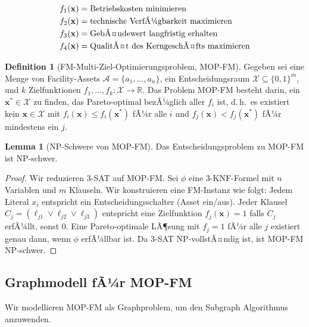 ﻿\documentclass[a4paper,12pt]{article}
\theoremstyle{definition}
\newtheorem{definition}{Definition}[section]
\newtheorem{lemma}{Lemma}[section]
\begin{document}
\begin{align}
    f_1(\mathbf{x}) &= \text{Betriebskosten minimieren} \notag \\
    f_2(\mathbf{x}) &= \text{technische VerfÃ¼gbarkeit maximieren} \notag \\
    f_3(\mathbf{x}) &= \text{GebÃ¤udewert langfristig erhalten} \notag \\
    f_4(\mathbf{x}) &= \text{QualitÃ¤t des KerngeschÃ¤fts maximieren} \notag
\end{align}

\begin{definition}[FM-Multi-Ziel-Optimierungsproblem, MOP-FM]
\label{def:mopfm}
Gegeben sei eine Menge von Facility-Assets $\mathcal{A} = \{a_1, \ldots, a_n\}$,
ein Entscheidungsraum $\mathcal{X} \subseteq \{0,1\}^m$, und $k$ Zielfunktionen
$f_1, \ldots, f_k : \mathcal{X} \to \mathbb{R}$.
Das Problem MOP-FM besteht darin, ein $\mathbf{x}^* \in \mathcal{X}$ zu finden,
das Pareto-optimal bezÃ¼glich aller $f_i$ ist, d.\,h.\ es existiert kein
$\mathbf{x} \in \mathcal{X}$ mit $f_i(\mathbf{x}) \leq f_i(\mathbf{x}^*)$ fÃ¼r alle $i$
und $f_j(\mathbf{x}) < f_j(\mathbf{x}^*)$ fÃ¼r mindestens ein $j$.
\end{definition}

\begin{lemma}[NP-Schwere von MOP-FM]
\label{lem:mop-np}
Das Entscheidungsproblem zu MOP-FM ist NP-schwer.
\end{lemma}

\begin{proof}
Wir reduzieren 3-SAT auf MOP-FM. Sei $\phi$ eine 3-KNF-Formel mit $n$ Variablen
und $m$ Klauseln. Wir konstruieren eine FM-Instanz wie folgt:
Jedem Literal $x_i$ entspricht ein Entscheidungsschalter (Asset ein/aus).
Jeder Klausel $C_j = (\ell_{j1} \vee \ell_{j2} \vee \ell_{j3})$ entspricht
eine Zielfunktion $f_j(\mathbf{x}) = 1$ falls $C_j$ erfÃ¼llt, sonst $0$.
Eine Pareto-optimale LÃ¶sung mit $f_j = 1$ fÃ¼r alle $j$ existiert genau dann,
wenn $\phi$ erfÃ¼llbar ist. Da 3-SAT NP-vollstÃ¤ndig ist, ist MOP-FM NP-schwer.
\end{proof}

\subsection{Graphmodell fÃ¼r MOP-FM}

Wir modellieren MOP-FM als Graphproblem, um den Subgraph Algorithmus anzuwenden.
\end{document}
